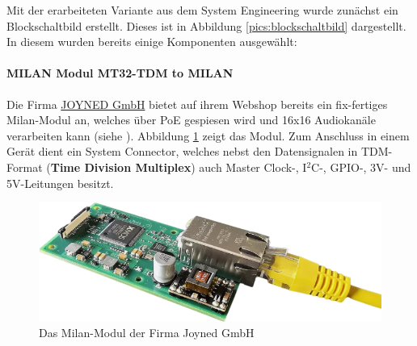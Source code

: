 Mit der erarbeiteten Variante aus dem System Engineering wurde zunächst ein Blockschaltbild erstellt. Dieses ist in Abbildung \ref{pics:blockschaltbild} dargestellt. In diesem wurden bereits einige Komponenten ausgewählt: 
\paragraph{MILAN Modul MT32-TDM to MILAN} Die Firma \href{https://www.joyned.at/}{JOYNED GmbH} bietet auf ihrem Webshop bereits ein fix-fertiges Milan-Modul an, welches über PoE gespiesen wird und 16x16 Audiokanäle verarbeiten kann (siehe \cite{joyned_store}). Abbildung \ref{pics:mt32_TDM} zeigt das Modul. Zum Anschluss in einem Gerät dient ein System Connector, welches nebst den Datensignalen in TDM-Format (\textbf{Time Division Multiplex}) auch Master Clock-, I$^{2}$C-, GPIO-, 3V- und 5V-Leitungen besitzt.
\begin{figure}[H]
	\centering
	\includegraphics[width=\textwidth*3/4]{pictures/Joyned_MT32-TDM.png}
	\caption{Das Milan-Modul der Firma Joyned GmbH}
	\label{pics:mt32_TDM}
\end{figure}
